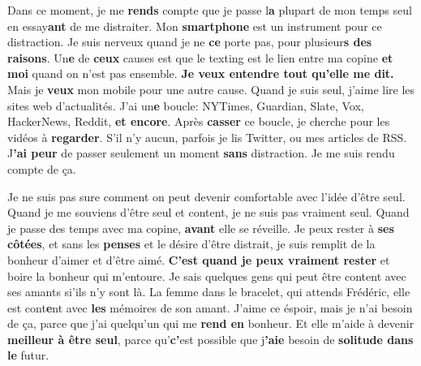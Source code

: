 \documentclass{article}
\newcommand{\bo}[1]{\textbf{#1}}
\begin{document}
\begin{doublespace}
Dans ce moment, je me \bo{rends} compte que je passe l\bo{a} plupart de mon
	temps seul en essay\bo{ant} de me distraiter.
Mon \bo{smartphone} est un instrument pour ce distraction.
Je suis nerveux quand je ne \bo{ce} porte pas, pour plusieur\bo{s des raisons}.
Un\bo{e} de \bo{ceux} causes est que le texting est le lien entre ma
	copine \bo{et moi} quand on n'est pas ensemble.
\bo{Je veux entendre tout qu'elle me dit.}
Mais je \bo{veux} mon mobile pour une autre cause.
Quand je suis seul, j'aime lire les sites web d'actualités.
J'ai un\bo{e} boucle: NYTimes, Guardian, Slate, Vox, HackerNews,
	Reddit, \bo{et encore}.
Après \bo{casser} ce boucle, je cherche pour les vidéos à \bo{regarder}.
S'il n'y aucun, parfois je lis Twitter, ou mes articles de RSS.
J\bo{'ai peur} de passer seulement un moment \bo{sans} distraction.
Je me suis rendu compte de ça.

Je ne suis pas sure comment on peut devenir comfortable avec l'idée 
	d'être seul.
Quand je me souviens d'être seul et content, je ne suis pas
	vraiment seul.
Quand je passe des temps avec ma copine, \bo{avant} elle
	se réveille.
Je peux rester à \bo{ses côtées}, et sans les \bo{penses} et le désire d'être distrait,
	je suis remplit de la bonheur d'aimer et d'être aimé.
\bo{C'est quand je peux vraiment rester} et boire la bonheur qui m'entoure.
Je sais quelques gens qui peut être content avec ses amants si'ils n'y sont
	là.
La femme dans le bracelet, qui attends Frédéric, elle est cont\bo{e}nt avec
	\bo{les} mémoires de son amant.
J'aime ce éspoir, mais je n'ai besoin de ça, parce que j'ai quelqu'un
	qui me \bo{rend en} bonheur.
Et elle m'aide à devenir \bo{meilleur à être seul},
	parce qu'\bo{c'}est possible que j\bo{'aie} besoin de \bo{solitude dans le} futur.


\end{doublespace}
\end{document}
